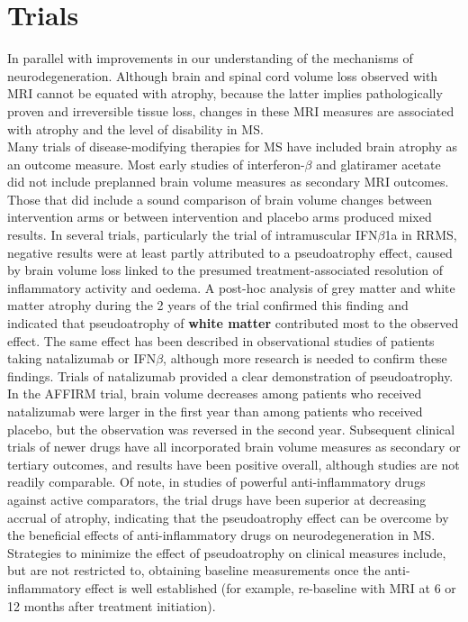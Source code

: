 \documentclass[final, paper=letter,5p,times,twocolumn]{elsarticle}
\theoremstyle{definition}
\begin{document}
\section{Trials}

In parallel with improvements in our understanding of the mechanisms of neurodegeneration. Although brain and spinal cord volume loss observed with MRI cannot be equated with atrophy, because the latter implies pathologically proven and irreversible tissue loss, changes in these MRI measures are associated with atrophy and the level of disability in MS. \\
Many trials of disease-​modifying therapies for MS have included brain atrophy as an outcome measure. Most early studies of interferon-$\beta$ and glatiramer acetate did not include preplanned brain volume measures as secondary MRI outcomes. Those that did include a sound comparison of brain volume changes between intervention arms or between intervention and placebo arms produced mixed results. In several trials, particularly the trial of intramuscular IFN$\beta$1a in RRMS, negative results were at least partly attributed to a pseudoatrophy effect, caused by brain volume loss linked to the presumed treatment-​associated resolution of inflammatory activity and oedema. A post-hoc analysis of grey matter and white matter atrophy during the 2 years of the trial confirmed this finding and indicated that pseudoatrophy of {\bf white matter} contributed most to the observed effect. The same effect has been described in observational studies of patients taking natalizumab or IFN$\beta$, although more research is needed to confirm these findings. Trials of natalizumab provided a clear demonstration of pseudoatrophy. In the AFFIRM trial, brain volume decreases among patients who received natalizumab were larger in the first year than among patients who received placebo, but the observation was reversed in the second year. Subsequent clinical trials of newer drugs have all incorporated brain volume measures as secondary or tertiary outcomes, and results have been positive overall, although studies are not readily comparable. Of note, in studies of powerful anti-​inflammatory drugs against active comparators, the trial drugs have been superior at decreasing accrual of atrophy, indicating that the pseudoatrophy effect can be overcome by the beneficial effects of anti-​inflammatory drugs on neurodegeneration in MS.\\
Strategies to minimize the effect of pseudoatrophy on clinical measures include, but are not restricted to, obtaining baseline measurements once the anti-inflammatory effect is well established (for example, re-baseline with MRI at 6 or 12 months after treatment initiation).
\end{document}
